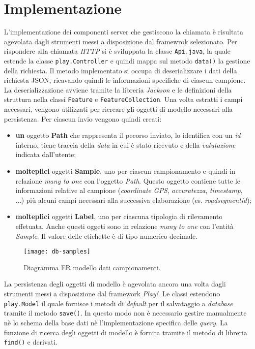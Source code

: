 \section{Implementazione}
L'implementazione dei componenti server che gestiscono la chiamata è risultata agevolata dagli strumenti messi a disposizione dal framewrok selezionato. Per rispondere alla chiamata \emph{HTTP} si è sviluppata la classe \texttt{Api.java}, la quale estende la classe \texttt{play.Controller} e quindi mappa sul metodo \texttt{data()} la gestione della richiesta.
Il metodo implementato si occupa di deserializzare i dati della richiesta JSON, ricavando quindi le informazioni specifiche di ciascun campione. La deserializzazione avviene tramite la libreria \emph{Jackson} e le definizioni della struttura nella classi \texttt{Feature} e \texttt{FeatureCollection}.
Una volta estratti i campi necessari, vengono utilizzati per ricreare gli oggetti di modello necessari alla persistenza. Per ciascun invio vengono quindi creati:
\begin{itemize}
    \item \textbf{un} oggetto \textbf{Path} che rappresenta il pecorso inviato, lo identifica con un \emph{id} interno, tiene traccia della \emph{data} in cui è stato ricevuto e della \emph{valutazione} indicata dall'utente;
    \item \textbf{molteplici} oggetti \textbf{Sample}, uno per ciascun campionamento e quindi in relazione \emph{many to one} con l'oggetto \emph{Path}. Questo oggetto contiene tutte le informazioni relative al campione (\emph{coordinate GPS}, \emph{accuratezza}, \emph{timestamp}, ...) più alcuni campi necessari alla successiva elaborazione (es. \emph{roadsegment\textunderscore id});
    \item \textbf{molteplici} oggetti \textbf{Label}, uno per ciascuna tipologia di rilevamento effetuata. Anche questi oggeti sono in relazione \emph{many to one} con l'entità \emph{Sample}. Il valore delle etichette è di tipo numerico decimale.
\end{itemize}

\begin{figure}[ht]
  \centering
  \texttt{[image: db-samples]}
  \caption{\footnotesize{Diagramma ER modello dati campionamenti.}}
  \label{fig:db-samples}
\end{figure}
La persistenza degli oggetti di modello è agevolata ancora una volta dagli strumenti messi a disposizione dal framework \emph{Play!}. Le classi estendono \texttt{play.Model} il quale fornisce i metodi di \emph{default} per il salvataggio a \emph{database} tramite il metodo \texttt{save()}. In questo modo non è necessario gestire manualmente nè lo schema della base dati nè l'implementazione specifica delle \emph{query}. La funzione di ricerca degli oggetti di modello è fornita tramite il metodo di libreria \texttt{find()} e derivati.

